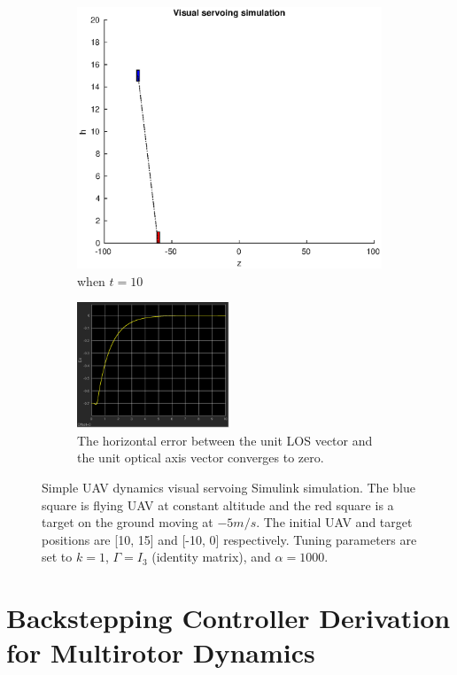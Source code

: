 \begin{figure}
\begin{subfigure}[b]{0.45\linewidth}
		\includegraphics[width=\textwidth]{images/chapter4/another_simple_ten}
		\caption{when $t=10$}
	\end{subfigure}
	\begin{subfigure}[b]{0.8\linewidth}
		\centering
		\includegraphics[width=0.5\textwidth]{images/chapter4/another_simple_ex}
		\caption{The horizontal error between the unit LOS vector and the unit optical axis vector converges to zero.}
	\end{subfigure}	
	\caption{Simple UAV dynamics visual servoing Simulink simulation. The blue square is flying UAV at constant altitude and the red square is a target on the ground moving at $-5m/s$. The initial UAV and target positions are [10, 15] and [-10, 0] respectively. Tuning parameters are set to $k=1$, $\Gamma=I_3$ (identity matrix), and $\alpha=1000$.}
	\label{another_simple_simulation}
\end{figure}


\section{Backstepping Controller Derivation for Multirotor Dynamics}
